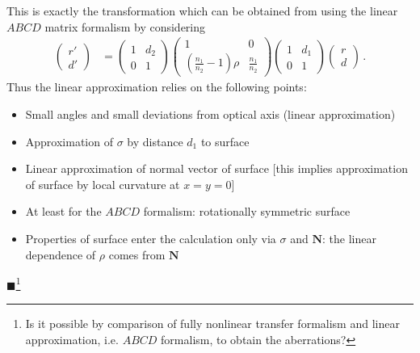\documentclass[12pt,a4paper,twoside,openright,BCOR10mm,headsepline,titlepage,abstracton,chapterprefix,final]{scrreprt}
\newcommand\Vector[1]{{\mathbf{#1}}}
\newcommand{\remark}[1]{{\color{red}$\blacksquare$}\footnote{{\color{red}#1}}}
\begin{document}
This is exactly the transformation which can be obtained from using the linear $ABCD$ matrix formalism by considering
\begin{align}
 \begin{pmatrix} r'  \\ d' \end{pmatrix} &=
 \begin{pmatrix} 1 & d_2 \\ 0 & 1 \end{pmatrix}
 \begin{pmatrix} 1 & 0 \\ \left(\frac{n_1}{n_2} - 1\right)\rho & \frac{n_1}{n_2} \end{pmatrix}
 \begin{pmatrix} 1 & d_1 \\ 0 & 1 \end{pmatrix}
 \begin{pmatrix} r  \\ d \end{pmatrix}\,.
\end{align}
Thus the linear approximation relies on the following points:
\begin{itemize}
 \item Small angles and small deviations from optical axis (linear approximation)
 \item Approximation of $\sigma$ by distance $d_1$ to surface 
 \item Linear approximation of normal vector of surface [this implies approximation of surface by local curvature at $x=y=0$]
 \item At least for the $ABCD$ formalism: rotationally symmetric surface
 \item Properties of surface enter the calculation only via $\sigma$ and $\Vector{N}$: the linear dependence of $\rho$ comes from $\Vector{N}$
\end{itemize}
\remark{Is it possible by comparison of fully nonlinear transfer formalism and linear approximation, i.e. $ABCD$ formalism, to obtain the
aberrations?}
\end{document}
